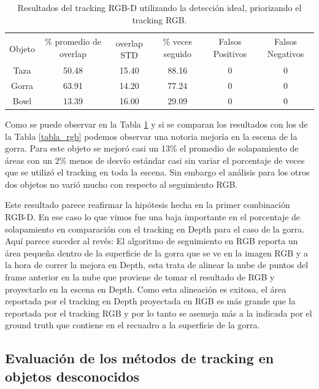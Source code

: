 \begin{table}[h]
    \begin{tabular}{|c|c|c|c|c|c|}
    \hline
    & \multirow{2}{2.4cm}{\% promedio de overlap} & & \multirow{2}{2cm}{\% veces seguido} & \multirow{2}{1.6cm}{Falsos Positivos} & \multirow{2}{1.6cm}{Falsos Negativos}\\
	Objeto & & overlap STD & & &\\
    \hline
    Taza   & 50.48      & 15.40       & 88.16             & 0                & 0\\
    \hline
    Gorra  & 63.91      & 14.20       & 77.24             & 0                & 0\\
    \hline
    Bowl   & 13.39      & 16.00       & 29.09             & 0                & 0\\
    \hline
    \end{tabular}
\caption{Resultados del tracking RGB-D utilizando la detección ideal, priorizando el tracking RGB.}
\label{tabla_rgbd_rgb}
\end{table}


Como se puede observar en la Tabla \ref{tabla_rgbd_rgb} y si se comparan los resultados con los de la Tabla \ref{tabla_rgb} podemos observar una notoria mejoría en la escena de la gorra. Para este objeto se mejoró casi un 13\% el promedio de solapamiento de áreas con un 2\% menos de desvío estándar casi sin variar el porcentaje de veces que se utilizó el tracking en toda la escena. Sin embargo el análisis para los otros dos objetos no varió mucho con respecto al seguimiento RGB.

Este resultado parece reafirmar la hipótesis hecha en la primer combinación RGB-D. En ese caso lo que vimos fue una baja importante en el porcentaje de solapamiento en comparación con el tracking en Depth para el caso de la gorra. Aquí parece suceder al revés: El algoritmo de seguimiento en RGB reporta un área pequeña dentro de la superficie de la gorra que se ve en la imagen RGB y a la hora de correr la mejora en Depth, esta trata de alinear la nube de puntos del frame anterior en la nube que proviene de tomar el resultado de RGB y proyectarlo en la escena en Depth. Como esta alineación es exitosa, el área reportada por el tracking en Depth proyectada en RGB es más grande que la reportada por el tracking RGB y por lo tanto se asemeja más a la indicada por el ground truth que contiene en el recuadro a la superficie de la gorra.




\subsection{Evaluación de los métodos de tracking en objetos desconocidos}

